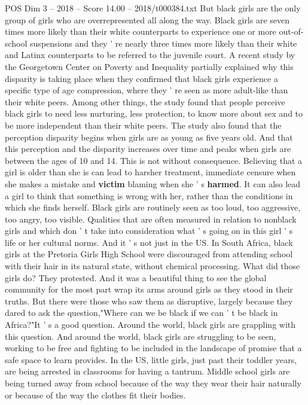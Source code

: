 \begin{textsample}{POS Dim 3 – 2018 – Score 14.00 – 2018/t000384.txt}
But black girls are the only group of girls who are overrepresented all along the way.
Black girls are seven times more likely than their white counterparts to experience one or more out-of-school suspensions and they ' re nearly three times more likely than their white and Latinx counterparts to be referred to the juvenile court.
A recent study by the Georgetown Center on Poverty and Inequality partially explained why this disparity is taking place when they confirmed that black girls experience a specific type of age compression, where they ' re seen as more adult-like than their white peers.
Among other things, the study found that people perceive black girls to need less nurturing, less protection, to know more about sex and to be more independent than their white peers.
The study also found that the perception disparity begins when girls are as young as five years old.
And that this perception and the disparity increases over time and peaks when girls are between the ages of 10 and 14.
This is not without consequence.
Believing that a girl is older than she is can lead to harsher treatment, immediate censure when she makes a mistake and \textbf{victim} blaming when she ' s \textbf{harmed}.
It can also lead a girl to think that something is wrong with her, rather than the conditions in which she finds herself.
Black girls are routinely seen as too loud, too aggressive, too angry, too visible.
Qualities that are often measured in relation to nonblack girls and which don ' t take into consideration what ' s going on in this girl ' s life or her cultural norms.
And it ' s not just in the US.
In South Africa, black girls at the Pretoria Girls High School were discouraged from attending school with their hair in its natural state, without chemical processing.
What did those girls do?
They protested.
And it was a beautiful thing to see the global community for the most part wrap its arms around girls as they stood in their truths.
But there were those who saw them as disruptive, largely because they dared to ask the question,"Where can we be black if we can ' t be black in Africa?"It ' s a good question.
Around the world, black girls are grappling with this question.
And around the world, black girls are struggling to be seen, working to be free and fighting to be included in the landscape of promise that a safe space to learn provides.
In the US, little girls, just past their toddler years, are being arrested in classrooms for having a tantrum.
Middle school girls are being turned away from school because of the way they wear their hair naturally or because of the way the clothes fit their bodies.

\end{textsample}
